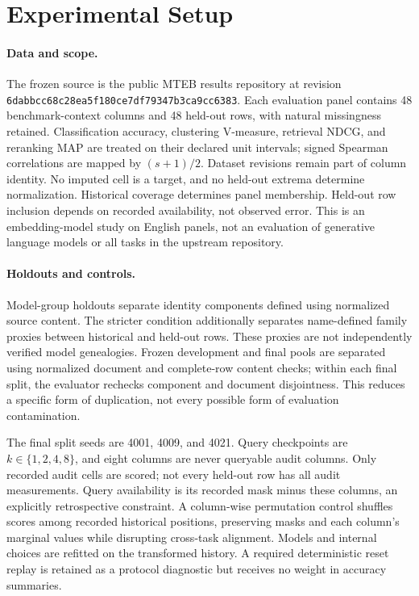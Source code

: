 \documentclass{article}
\begin{document}
\section{Experimental Setup}
\paragraph{Data and scope.}
The frozen source is the public MTEB results repository at revision \texttt{6dabbcc68c28ea5f180ce7df79347b3ca9cc6383}. Each evaluation panel contains 48 benchmark-context columns and 48 held-out rows, with natural missingness retained. Classification accuracy, clustering V-measure, retrieval NDCG, and reranking MAP are treated on their declared unit intervals; signed Spearman correlations are mapped by $(s+1)/2$. Dataset revisions remain part of column identity. No imputed cell is a target, and no held-out extrema determine normalization. Historical coverage determines panel membership. Held-out row inclusion depends on recorded availability, not observed error. This is an embedding-model study on English panels, not an evaluation of generative language models or all tasks in the upstream repository.

\paragraph{Holdouts and controls.}
Model-group holdouts separate identity components defined using normalized source content. The stricter condition additionally separates name-defined family proxies between historical and held-out rows. These proxies are not independently verified model genealogies. Frozen development and final pools are separated using normalized document and complete-row content checks; within each final split, the evaluator rechecks component and document disjointness. This reduces a specific form of duplication, not every possible form of evaluation contamination.

The final split seeds are 4001, 4009, and 4021. Query checkpoints are $k\in\{1,2,4,8\}$, and eight columns are never queryable audit columns. Only recorded audit cells are scored; not every held-out row has all audit measurements. Query availability is its recorded mask minus these columns, an explicitly retrospective constraint. A column-wise permutation control shuffles scores among recorded historical positions, preserving masks and each column's marginal values while disrupting cross-task alignment. Models and internal choices are refitted on the transformed history. A required deterministic reset replay is retained as a protocol diagnostic but receives no weight in accuracy summaries.
\end{document}
